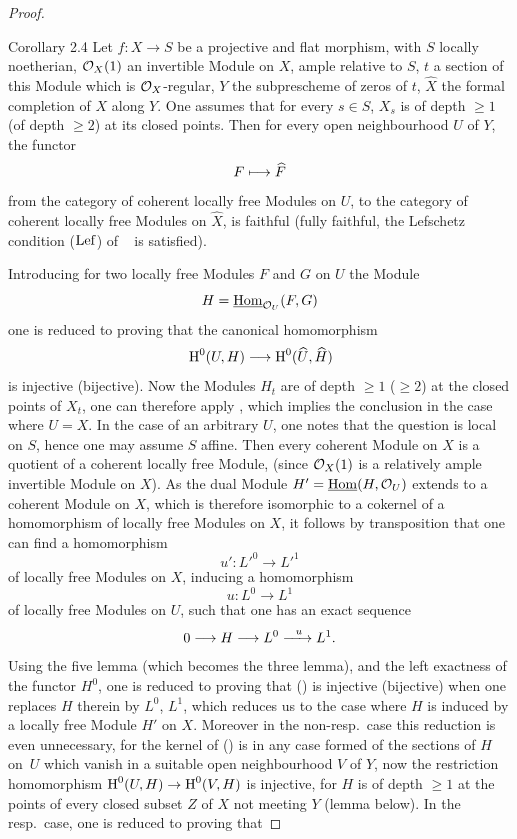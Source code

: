 \begin{proof}
\label{XII.2.4}
\begin{enonce*}{Corollary 2.4\ndemark}
Let $f:X\to S$ be a projective and flat morphism, with $S$ locally noetherian, $\mathcal{O}_X(1)$ an invertible Module on $X$, ample relative to $S$, $t$ a section of this Module which is $\mathcal{O}_X$-regular, $Y$ the subprescheme of zeros of $t$, $\widehat{X}$ the formal completion of $X$ along $Y$. One assumes that for every $s\in S$, $X_s$ is of depth $\geq 1$ (\resp of depth $\geq 2$) at its closed points. Then for every open neighbourhood $U$ of $Y$, the functor
\[
F \mto \widehat{F}
\]
from the category of coherent locally free Modules on $U$, to the category of coherent locally free Modules on $\widehat{X}$, is faithful (\resp fully faithful, \ie the Lefschetz condition ($\operatorname{Lef}$) of ~ is satisfied).
\end{enonce*}
Introducing for two locally free Modules $F$ and $G$ on $U$ the Module
\[
H=\operatorname{\underline{Hom}}_{{\mathcal O}_U}(F, G)
\]
one is reduced to proving that the canonical homomorphism
\steco
\begin{equation} \label{eq:XII.15} {}\H^0(U, H) \to \H^0(\widehat{U}, \widehat{H})
\end{equation}
is injective (\resp bijective). Now the Modules $H_t$ are of depth $\geq 1$ (\resp $\geq 2$) at the closed points of $X_t$, one can therefore apply , which implies the conclusion  in the case where $U=X$. In the case of an arbitrary $U$, one notes that the question is local on $S$, hence one may assume $S$ affine. Then every coherent Module on $X$ is a quotient of a coherent locally free Module, (since $\mathcal{O}_X(1)$ is a relatively ample invertible Module on $X$). As the dual Module $H'=\operatorname{\underline{Hom}}(H, {\mathcal O}_U)$ extends to a coherent Module on $X$, which is therefore isomorphic to a cokernel of a homomorphism of locally free Modules on $X$, it follows by transposition that one can find a homomorphism
\[
u':{L'}^0 \to {L'}^1
\]
of locally free Modules on $X$, inducing a homomorphism
\[
u:L^0 \to L^1
\]
of locally free Modules on $U$, such that one has an exact sequence
\[
0\to H \to L^0 \lto{u} L^1.
\]
Using the five lemma (which becomes the three lemma), and the left exactness of the functor $H^0$, one is reduced to proving that () is injective (\resp bijective) when one replaces $H$ therein by $L^0$, $L^1$, which reduces us to the case where $H$ is induced by a locally free Module $H'$ on $X$. Moreover in the non-resp.\ case this reduction is even unnecessary, for the kernel of () is in any case formed of the sections of $H$ on~$U$ which vanish in a suitable open neighbourhood $V$ of $Y$, now the restriction homomorphism $\H^0(U, H)\to\H^0(V, H)$ is injective, for $H$ is of depth $\geq 1$ at the points of every closed subset $Z$ of $X$ not meeting $Y$ (\cf lemma below). In the resp.\ case, one is reduced to proving that

\end{proof}
